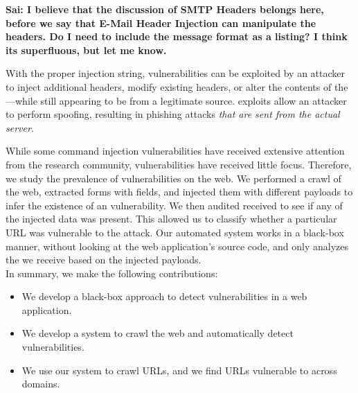 \textbf{Sai: I believe that the discussion of SMTP Headers belongs here, before we say that E-Mail Header Injection can manipulate the headers. Do I need to include the message format as a listing? I think its superfluous, but let me know.}

With the proper injection string, \ehi vulnerabilities can be exploited by an attacker to inject additional headers, modify existing headers, or alter the contents of the \email---while still appearing to be from a legitimate source. \ehi exploits allow an attacker to perform \email spoofing, resulting in phishing attacks \emph{that are sent from the actual \email server}.


While some command injection vulnerabilities have received extensive attention from the research community, \ehi vulnerabilities have received little focus. Therefore, we study the prevalence of \ehi vulnerabilities on the web. We performed a crawl of the web, extracted forms with \email fields, and injected them with different payloads to infer the existence of an \ehi vulnerability. We then audited received \emails to see if any of the injected data was present. This allowed us to classify whether a particular URL was vulnerable to the attack. Our automated system works in a black-box manner, without looking at the web application's source code, and only analyzes the \emails we receive based on the injected payloads.
\\

\noindent{}In summary, we make the following contributions:

\begin{itemize}

\item We develop a black-box approach to detect \ehi vulnerabilities in a web application.

\item We develop a system to crawl the web and automatically detect \ehi vulnerabilities.

\item We use our system to crawl \urls URLs, and we find \success URLs vulnerable to \ehi across \domains domains. 

\end{itemize}
